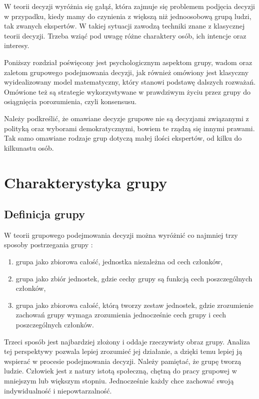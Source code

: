W teorii decyzji wyróżnia się gałąź, która zajmuje się problemem podjęcia
decyzji w przypadku, kiedy mamy do czynienia z większą niż jednoosobową grupą
ludzi, tak zwanych ekspertów. W takiej sytuacji zawodzą techniki znane  z
klasycznej teorii decyzji. Trzeba wziąć pod uwagę różne charaktery osób, ich
intencje oraz interesy.

Poniższy rozdział poświęcony jest psychologicznym aspektom grupy, wadom oraz 
zaletom grupowego podejmowania decyzji, jak również omówiony jest klasyczny
wyidealizowany model matematyczny, który stanowi podstawę dalszych rozważań.
Omówione też są strategie wykorzystywane w prawdziwym życiu przez grupy do
osiągnięcia porozumienia, czyli konsensusu.

Należy podkreślić, że omawiane decyzje grupowe nie są decyzjami związanymi z
polityką oraz wyborami demokratycznymi, bowiem te rządzą się innymi prawami. Tak
samo omawiane rodzaje grup dotyczą małej ilości ekspertów, od kilku do
kilkunastu osób.
\section{Charakterystyka grupy}

\subsection{Definicja grupy}
W teorii grupowego podejmowania decyzji można wyróżnić co najmniej trzy sposoby 
postrzegania grupy \cite{VanDeVen1971}:
\begin{enumerate}

\item grupa jako zbiorowa całość, jednostka niezależna od cech członków,

\item grupa jako zbiór jednostek, gdzie cechy grupy są funkcją cech
poszczególnych członków,

\item grupa jako zbiorowa całość, którą tworzy zestaw jednostek, gdzie
zrozumienie zachowań grupy wymaga zrozumienia jednocześnie cech grupy i cech
poszczególnych członków.

\end{enumerate}
Trzeci sposób jest najbardziej złożony i oddaje rzeczywisty obraz grupy. Analiza
tej perspektywy pozwala lepiej zrozumieć jej działanie, a dzięki temu lepiej ją
wspierać w procesie podejmowania decyzji. Należy pamiętać, że grupę tworzą
ludzie. Człowiek jest z natury istotą społeczną, chętną do pracy grupowej w
mniejszym lub większym stopniu. Jednocześnie każdy chce zachować swoją
indywidualność i niepowtarzalność.

